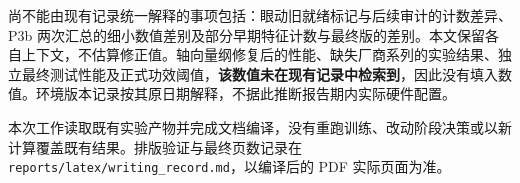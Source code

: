 \documentclass[UTF8,11pt,a4paper]{ctexart}
\begin{document}
尚不能由现有记录统一解释的事项包括：眼动旧就绪标记与后续审计的计数差异、P3b 两次汇总的细小数值差别及部分早期特征计数与最终版的差别。本文保留各自上下文，不估算修正值。轴向量纲修复后的性能、缺失厂商系列的实验结果、独立最终测试性能及正式功效阈值，\textbf{该数值未在现有记录中检索到}，因此没有填入数值。环境版本记录按其原日期解释，不据此推断报告期内实际硬件配置。

本次工作读取既有实验产物并完成文档编译，没有重跑训练、改动阶段决策或以新计算覆盖既有结果。排版验证与最终页数记录在 \texttt{reports/latex/writing\_record.md}，以编译后的 PDF 实际页面为准。
\end{document}
